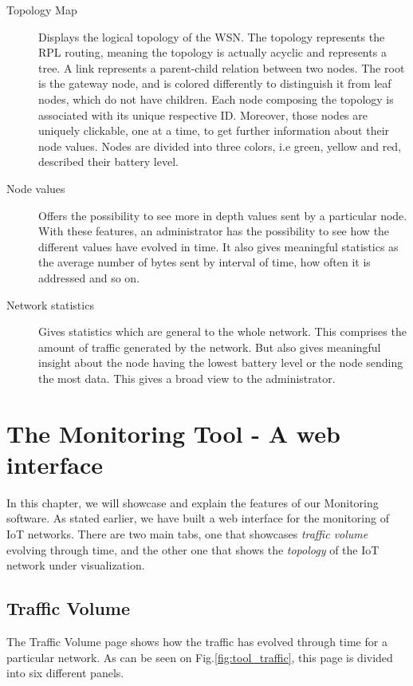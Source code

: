 \begin{description}
	\item[Topology Map] Displays the logical topology of the WSN. The topology represents the RPL routing, meaning the topology is actually acyclic and represents a tree. A link represents a parent-child relation between two nodes. The root is the gateway node, and is colored differently to distinguish it from leaf nodes, which do not have children. Each node composing the topology is associated with its unique respective ID. Moreover, those nodes are uniquely clickable, one at a time, to get further information about their node values. Nodes are divided into three colors, i.e green, yellow and red, described their battery level.
	\item[Node values] Offers the possibility to see more in depth values sent by a particular node. With these features, an administrator has the possibility to see how the different values have evolved in time. It also gives meaningful statistics as the average number of bytes sent by interval of time, how often it is addressed and so on.
	\item[Network statistics] Gives statistics which are general to the whole network. This comprises the amount of traffic generated by the network. But also gives meaningful insight about the node having the lowest battery level or the node sending the most data. This gives a broad view to the administrator.
\end{description}

\chapter{The Monitoring Tool - A web interface}

In this chapter, we will showcase and explain the features of our Monitoring software. As stated earlier, we have built a web interface for the monitoring of IoT networks. There are two main tabs, one that showcases \textit{traffic volume} evolving through time, and the other one that shows the \textit{topology} of the IoT network under visualization.

\section{Traffic Volume}

The Traffic Volume page shows how the traffic has evolved through time for a particular network. As can be seen on Fig.\ref{fig:tool_traffic}, this page is divided into six different panels. \\

